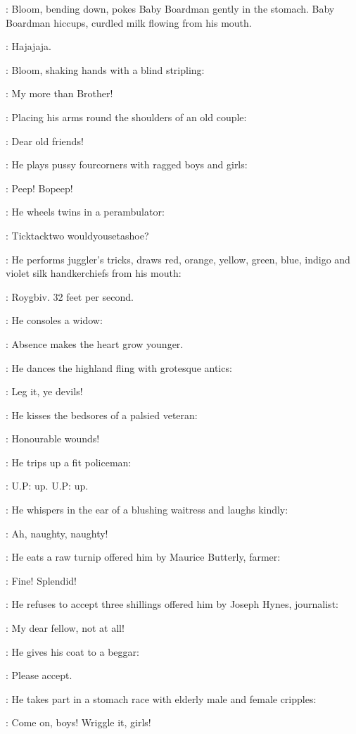 :
Bloom,
bending down,
pokes Baby Boardman gently in the stomach.
Baby Boardman hiccups,
curdled milk flowing from his mouth.

\BabyBoardman:
Hajajaja.

:
Bloom,
shaking hands with a blind stripling:

\Bloom:
My more than Brother!

:
Placing his arms round the shoulders of an old couple:

\Bloom:
Dear old friends!

:
He plays pussy fourcorners with ragged boys and girls:

\Bloom:
Peep!
Bopeep!

:
He wheels twins in a perambulator:

\Bloom:
Ticktacktwo wouldyousetashoe?

:
He performs juggler's tricks,
draws red,
orange,
yellow,
green,
blue,
indigo and violet silk handkerchiefs from his mouth:

\Bloom:
Roygbiv.
32 feet per second.

:
He consoles a widow:

\Bloom:
Absence makes the heart grow younger.

:
He dances the highland fling with grotesque antics:

\Bloom:
Leg it,
ye devils!

:
He kisses the bedsores of a palsied veteran:

\Bloom:
Honourable wounds!

:
He trips up a fit policeman:

\Bloom:
U.P:
up.
U.P:
up.

:
He whispers in the ear of a blushing waitress and laughs kindly:

\Bloom:
Ah,
naughty,
naughty!

:
He eats a raw turnip offered him by Maurice Butterly,
farmer:

\Bloom:
Fine!
Splendid!

:
He refuses to accept three shillings offered him by Joseph Hynes,
journalist:

\Bloom:
My dear fellow,
not at all!

:
He gives his coat to a beggar:

\Bloom:
Please accept.

:
He takes part in a stomach race with elderly male and female cripples:

\Bloom:
Come on,
boys!
Wriggle it,
girls!

